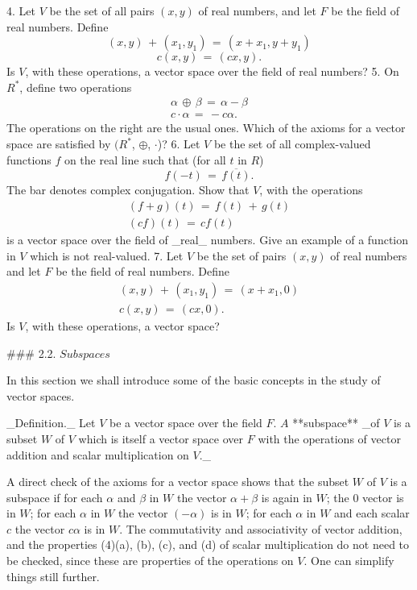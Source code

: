 4. Let \(V\) be the set of all pairs \((x,y)\) of real numbers, and let \(F\) be the field of real numbers. Define \[(x,y)\,+\,(x_{1},y_{1})\,=\,(x+x_{1},y+y_{1})\] \[c(x,y)\,=\,(cx,y).\] Is \(V\), with these operations, a vector space over the field of real numbers?
5. On \(R^{*}\), define two operations \[\begin{array}{rcl}\alpha\,\oplus\,\beta\,=\,\alpha-\beta\\ c\cdot\alpha\,=\,-c\alpha.\end{array}\] The operations on the right are the usual ones. Which of the axioms for a vector space are satisfied by \((R^{*}\), \(\oplus\), \(\cdot\))?
6. Let \(V\) be the set of all complex-valued functions \(f\) on the real line such that (for all \(t\) in \(R\)) \[f(-t)\,=\,\overline{f(t)}.\] The bar denotes complex conjugation. Show that \(V\), with the operations \[\begin{array}{rcl}(f+g)(t)\,=\,f(t)\,+\,g(t)\\ (cf)(t)\,=\,cf(t)\end{array}\] is a vector space over the field of _real_ numbers. Give an example of a function in \(V\) which is not real-valued.
7. Let \(V\) be the set of pairs \((x,y)\) of real numbers and let \(F\) be the field of real numbers. Define \[\begin{array}{rcl}(x,y)\,+\,(x_{1},y_{1})\,=\,(x+x_{1},0)\\ c(x,y)\,=\,(cx,0).\end{array}\] Is \(V\), with these operations, a vector space?

### 2.2. \(Subspaces\)

In this section we shall introduce some of the basic concepts in the study of vector spaces.

_Definition._ Let \(V\) be a vector space over the field \(F\). \(A\) **subspace** _of \(V\) is a subset \(W\) of \(V\) which is itself a vector space over \(F\) with the operations of vector addition and scalar multiplication on \(V\)._

A direct check of the axioms for a vector space shows that the subset \(W\) of \(V\) is a subspace if for each \(\alpha\) and \(\beta\) in \(W\) the vector \(\alpha+\beta\) is again in \(W\); the \(0\) vector is in \(W\); for each \(\alpha\) in \(W\) the vector \((-\alpha)\) is in \(W\); for each \(\alpha\) in \(W\) and each scalar \(c\) the vector \(c\alpha\) is in \(W\). The commutativity and associativity of vector addition, and the properties (4)(a), (b), (c), and (d) of scalar multiplication do not need to be checked, since these are properties of the operations on \(V\). One can simplify things still further.

 